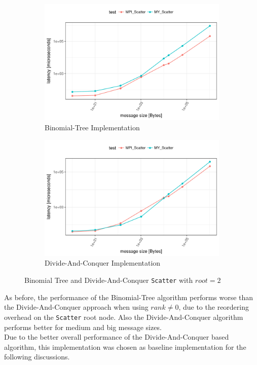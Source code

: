 \begin{figure}[H]
  \centering
  \begin{subfigure}[b]{0.49\textwidth}
        \includegraphics[width=\textwidth]{../benchmarks/openmpi/root=2/binom/scatter_32/runtime.pdf}
        \caption{Binomial-Tree Implementation}
    \end{subfigure}
    \begin{subfigure}[b]{0.49\textwidth}
        \includegraphics[width=\textwidth]{../benchmarks/openmpi/root=2/divide_conquer/scatter_32/runtime.pdf}
        \caption{Divide-And-Conquer Implementation}
    \end{subfigure}
    \caption{Binomial Tree and Divide-And-Conquer \texttt{Scatter} with $root = 2$}
    \label{fig:scatter:binom_vs_dac:root2}
\end{figure}

\noindent As before, the performance of the Binomial-Tree algorithm performs worse than the Divide-And-Conquer approach when using $rank \neq 0$, due to the reordering overhead on the \texttt{Scatter} root node. Also the Divide-And-Conquer algorithm performs better for medium and big message sizes.\\
Due to the better overall performance of the Divide-And-Conquer based algorithm, this implementation was  chosen as baseline implementation for the following discussions.


